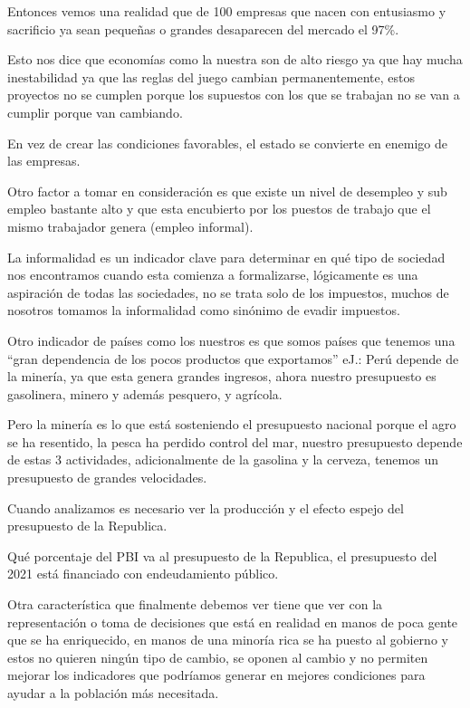 \documentclass[
  a4paper,
]{article}
\begin{document}
Entonces vemos una realidad que de 100 empresas que nacen con entusiasmo
y sacrificio ya sean pequeñas o grandes desaparecen del mercado el 97\%.

Esto nos dice que economías como la nuestra son de alto riesgo ya que
hay mucha inestabilidad ya que las reglas del juego cambian
permanentemente, estos proyectos no se cumplen porque los supuestos con
los que se trabajan no se van a cumplir porque van cambiando.

En vez de crear las condiciones favorables, el estado se convierte en
enemigo de las empresas.

Otro factor a tomar en consideración es que existe un nivel de desempleo
y sub empleo bastante alto y que esta encubierto por los puestos de
trabajo que el mismo trabajador genera (empleo informal).

La informalidad es un indicador clave para determinar en qué tipo de
sociedad nos encontramos cuando esta comienza a formalizarse,
lógicamente es una aspiración de todas las sociedades, no se trata solo
de los impuestos, muchos de nosotros tomamos la informalidad como
sinónimo de evadir impuestos.

Otro indicador de países como los nuestros es que somos países que
tenemos una ``gran dependencia de los pocos productos que exportamos''
eJ.: Perú depende de la minería, ya que esta genera grandes ingresos,
ahora nuestro presupuesto es gasolinera, minero y además pesquero, y
agrícola.

Pero la minería es lo que está sosteniendo el presupuesto nacional
porque el agro se ha resentido, la pesca ha perdido control del mar,
nuestro presupuesto depende de estas 3 actividades, adicionalmente de la
gasolina y la cerveza, tenemos un presupuesto de grandes velocidades.

Cuando analizamos es necesario ver la producción y el efecto espejo del
presupuesto de la Republica.

Qué porcentaje del PBI va al presupuesto de la Republica, el presupuesto
del 2021 está financiado con endeudamiento público.

Otra característica que finalmente debemos ver tiene que ver con la
representación o toma de decisiones que está en realidad en manos de
poca gente que se ha enriquecido, en manos de una minoría rica se ha
puesto al gobierno y estos no quieren ningún tipo de cambio, se oponen
al cambio y no permiten mejorar los indicadores que podríamos generar en
mejores condiciones para ayudar a la población más necesitada.
\end{document}
